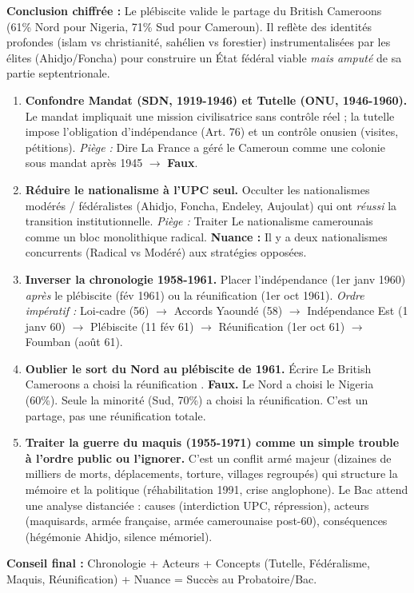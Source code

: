 \documentclass[11pt]{article}
\newcommand{\cle}[1]{{\popxbold\color{popdark}#1}}
\begin{document}
\begin{exoresolu}
\textbf{Conclusion chiffrée :} Le plébiscite valide le \cle{partage du British Cameroons} (61\% Nord pour Nigeria, 71\% Sud pour Cameroun). Il reflète des identités profondes (islam vs christianité, sahélien vs forestier) instrumentalisées par les élites (Ahidjo/Foncha) pour construire un État fédéral viable \emph{mais amputé} de sa partie septentrionale.
\end{exoresolu}

\begin{attention}
\begin{enumerate}
    \item \textbf{Confondre \cle{Mandat} (SDN, 1919-1946) et \cle{Tutelle} (ONU, 1946-1960).} Le mandat impliquait une \guillemotleft mission civilisatrice \guillemotright sans contrôle réel ; la tutelle impose l'\cle{obligation d'indépendance} (Art. 76) et un \cle{contrôle onusien} (visites, pétitions). \emph{Piège :} Dire \guillemotleft La France a géré le Cameroun comme une colonie sous mandat après 1945 \guillemotright $\rightarrow$ \textbf{Faux}.
    \item \textbf{Réduire le nationalisme à l'UPC seul.} Occulter les \cle{nationalismes modérés / fédéralistes} (Ahidjo, Foncha, Endeley, Aujoulat) qui ont \emph{réussi} la transition institutionnelle. \emph{Piège :} Traiter \guillemotleft Le nationalisme camerounais \guillemotright comme un bloc monolithique radical. \textbf{Nuance :} Il y a \cle{deux nationalismes} concurrents (Radical vs Modéré) aux stratégies opposées.
    \item \textbf{Inverser la chronologie 1958-1961.} Placer l'indépendance (1er janv 1960) \emph{après} le plébiscite (fév 1961) ou la réunification (1er oct 1961). \emph{Ordre impératif :} Loi-cadre (56) $\rightarrow$ Accords Yaoundé (58) $\rightarrow$ Indépendance Est (1 janv 60) $\rightarrow$ Plébiscite (11 fév 61) $\rightarrow$ Réunification (1er oct 61) $\rightarrow$ Foumban (août 61).
    \item \textbf{Oublier le sort du \cle{Nord} au plébiscite de 1961.} Écrire \guillemotleft Le British Cameroons a choisi la réunification \guillemotright. \textbf{Faux.} Le Nord a choisi le Nigeria (60\%). Seule la minorité (Sud, 70\%) a choisi la réunification. C'est un \cle{partage}, pas une réunification totale.
    \item \textbf{Traiter la \cle{guerre du maquis (1955-1971)} comme un simple \guillemotleft trouble à l'ordre public \guillemotright ou l'ignorer.} C'est un \cle{conflit armé majeur} (dizaines de milliers de morts, déplacements, torture, villages regroupés) qui structure la mémoire et la politique (réhabilitation 1991, crise anglophone). Le Bac attend une \cle{analyse distanciée} : causes (interdiction UPC, répression), acteurs (maquisards, armée française, armée camerounaise post-60), conséquences (hégémonie Ahidjo, silence mémoriel).
\end{enumerate}
\textbf{Conseil final :} \cle{Chronologie + Acteurs + Concepts (Tutelle, Fédéralisme, Maquis, Réunification) + Nuance} = Succès au Probatoire/Bac.
\end{attention}
\end{document}
